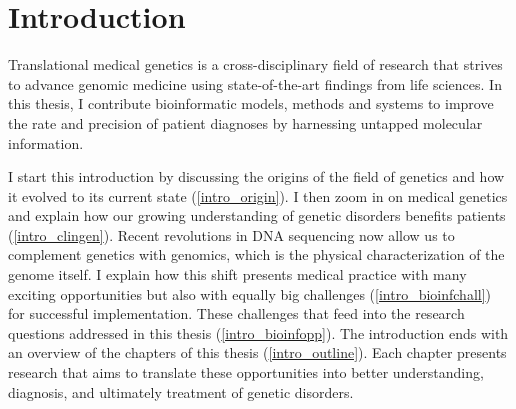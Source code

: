 \chapter{Introduction}
\label{chap:introduction}

{ \Large {} }

\newpage

\noindent
Translational medical genetics is a cross-disciplinary field of research that strives to advance genomic medicine using state-of-the-art findings from life sciences.
In this thesis, I contribute bioinformatic models, methods and systems to improve the rate and precision of patient diagnoses by harnessing untapped molecular information.

I start this introduction by discussing the origins of the field of genetics and how it evolved to its current state (\ref{intro_origin}).
I then zoom in on medical genetics and explain how our growing understanding of genetic disorders benefits patients (\ref{intro_clingen}).
Recent revolutions in DNA sequencing now allow us to complement genetics with genomics, which is the physical characterization of the genome itself.
I explain how this shift presents medical practice with many exciting opportunities but also with equally big challenges (\ref{intro_bioinfchall}) for successful implementation.
These challenges that feed into the research questions addressed in this thesis (\ref{intro_bioinfopp}).
The introduction ends with an overview of the chapters of this thesis (\ref{intro_outline}).
Each chapter presents research that aims to translate these opportunities into better understanding, diagnosis, and ultimately treatment of genetic disorders.

